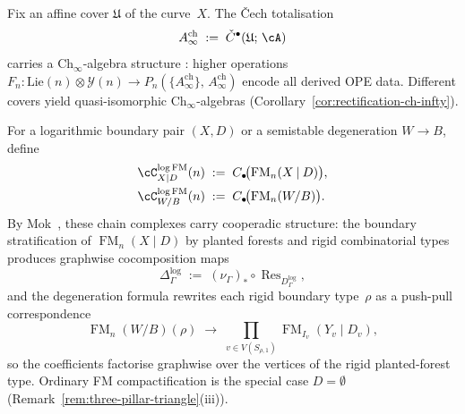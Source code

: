 \begin{construction}
\label{const:vol1-homotopy-chiral-input}
Fix an affine cover $\mathfrak{U}$ of the curve~$X$.
The \v{C}ech totalisation
\[
A^{\mathrm{ch}}_\infty
\;:=\;
\check{C}^\bullet(\mathfrak{U};\, \cA)
\]
carries a $\mathrm{Ch}_\infty$-algebra structure
\cite[Theorem~3.1]{MS24}: higher operations
$F_n\colon \mathrm{Lie}(n) \otimes \mathcal{Y}(n) \to
P_n(\{A^{\mathrm{ch}}_\infty\},\, A^{\mathrm{ch}}_\infty)$
encode all derived OPE data.  Different covers yield
quasi-isomorphic $\mathrm{Ch}_\infty$-algebras
(Corollary~\ref{cor:rectification-ch-infty}).
\end{construction}

\begin{construction}
\label{const:vol1-logfm-coefficient-cooperad}
For a logarithmic boundary pair $(X, D)$ or a semistable
degeneration $W \to B$, define
\begin{align}
\cC^{\log\mathrm{FM}}_{X \mathbin{|} D}(n)
&\;:=\;
C_\bullet\!\bigl(\operatorname{FM}_n(X \mathbin{|} D)\bigr),
\label{eq:logfm-cooperad-pair}\\
\cC^{\log\mathrm{FM}}_{W/B}(n)
&\;:=\;
C_\bullet\!\bigl(\operatorname{FM}_n(W/B)\bigr).
\label{eq:logfm-cooperad-family}
\end{align}
By Mok~\cite[Theorem~3.3.1, Corollary~5.3.4]{Mok25}, these chain
complexes carry cooperadic structure: the boundary stratification
of $\operatorname{FM}_n(X \mathbin{|} D)$ by planted forests and
rigid combinatorial types produces graphwise cocomposition maps
\begin{equation}\label{eq:logfm-cocomposition}
\Delta_\Gamma^{\log}
\;:=\;
(\nu_\Gamma)_* \circ
\operatorname{Res}_{D_\Gamma^{\log}},
\end{equation}
and the degeneration formula rewrites each rigid boundary type~$\rho$
as a push-pull correspondence
\begin{equation}\label{eq:mok-degeneration-correspondence}
\operatorname{FM}_n(W/B)(\rho)
\;\longrightarrow\;
\prod_{v \in V(S_{\rho,1})}
\operatorname{FM}_{I_v}(Y_v \mathbin{|} D_v),
\end{equation}
so the coefficients factorise graphwise over the vertices of the
rigid planted-forest type.  Ordinary FM compactification is the
special case $D = \emptyset$
\textup{(}Remark~\textup{\ref{rem:three-pillar-triangle}(iii))}.
\end{construction}


